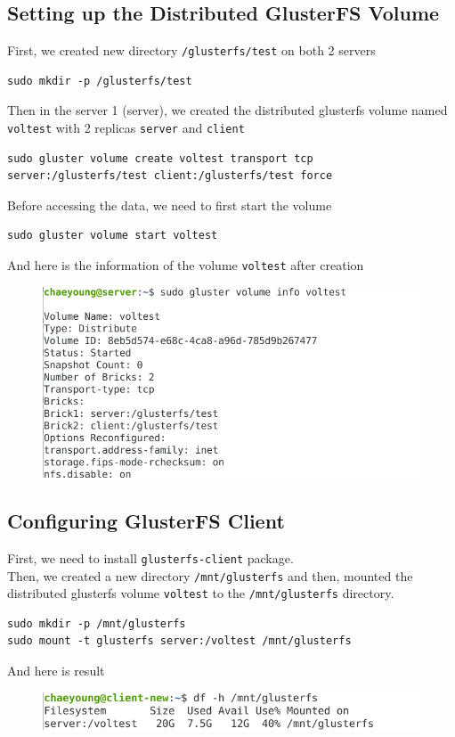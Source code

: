\documentclass[times, 10pt]{thesisMDH}
\begin{document}
\subsection{Setting up the Distributed GlusterFS Volume}
First, we created new directory \texttt{/glusterfs/test} on both 2 servers
\begin{lstlisting}
sudo mkdir -p /glusterfs/test
\end{lstlisting}
Then in the server 1 (server), we created the distributed glusterfs volume named \texttt{voltest} with 2 replicas \texttt{server} and \texttt{client}
\begin{lstlisting}
sudo gluster volume create voltest transport tcp server:/glusterfs/test client:/glusterfs/test force
\end{lstlisting}
Before accessing the data, we need to first start the volume
\begin{lstlisting}
sudo gluster volume start voltest
\end{lstlisting}
And here is the information of the volume \texttt{voltest} after creation
\begin{figure}[H]
    \centering
    \includegraphics[width=0.7\linewidth]{images/cap2.png}
\end{figure}

\subsection{Configuring GlusterFS Client}
First, we need to install \texttt{glusterfs-client} package.\\
Then, we created a new directory \texttt{/mnt/glusterfs} and then, mounted the distributed glusterfs volume \texttt{voltest} to the \texttt{/mnt/glusterfs} directory. 
\begin{lstlisting}
sudo mkdir -p /mnt/glusterfs
sudo mount -t glusterfs server:/voltest /mnt/glusterfs
\end{lstlisting}
And here is result
\begin{figure}[H]
    \centering
    \includegraphics[width=0.7\linewidth]{images/cap3.png}
\end{figure}
\end{document}
